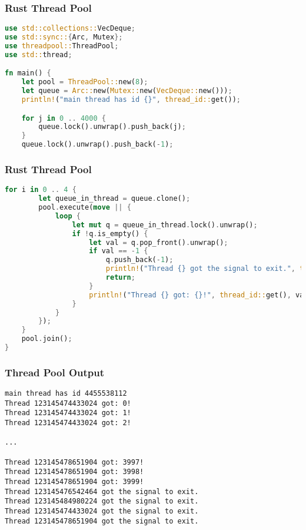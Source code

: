 \begin{frame}[fragile]
\frametitle{Rust Thread Pool}

\begin{lstlisting}[language=Rust]
use std::collections::VecDeque;
use std::sync::{Arc, Mutex};
use threadpool::ThreadPool;
use std::thread;

fn main() {
    let pool = ThreadPool::new(8);
    let queue = Arc::new(Mutex::new(VecDeque::new()));
    println!("main thread has id {}", thread_id::get());

    for j in 0 .. 4000 {
        queue.lock().unwrap().push_back(j);
    }
    queue.lock().unwrap().push_back(-1);
\end{lstlisting}


\end{frame}
\begin{frame}[fragile]
\frametitle{Rust Thread Pool}

\begin{lstlisting}[language=Rust]
    for i in 0 .. 4 {
        let queue_in_thread = queue.clone();
        pool.execute(move || {
            loop {
                let mut q = queue_in_thread.lock().unwrap();
                if !q.is_empty() {
                    let val = q.pop_front().unwrap();
                    if val == -1 {
                        q.push_back(-1);
                        println!("Thread {} got the signal to exit.", thread_id::get());
                        return;
                    }
                    println!("Thread {} got: {}!", thread_id::get(), val);
                }
            }
        });
    }
    pool.join();
}
\end{lstlisting}


\end{frame}


\begin{frame}[fragile]
\frametitle{Thread Pool Output}


\begin{verbatim}
main thread has id 4455538112
Thread 123145474433024 got: 0!
Thread 123145474433024 got: 1!
Thread 123145474433024 got: 2!

...

Thread 123145478651904 got: 3997!
Thread 123145478651904 got: 3998!
Thread 123145478651904 got: 3999!
Thread 123145476542464 got the signal to exit.
Thread 123145484980224 got the signal to exit.
Thread 123145474433024 got the signal to exit.
Thread 123145478651904 got the signal to exit.
\end{verbatim}


\end{frame}




